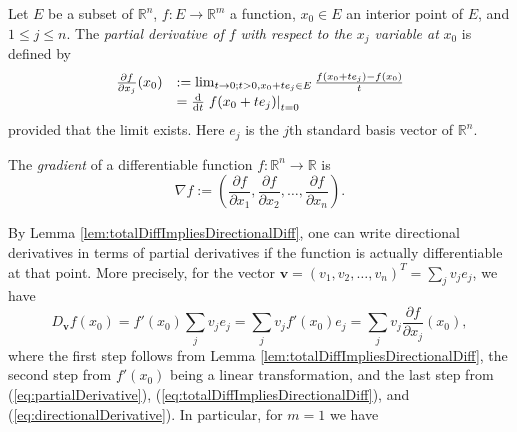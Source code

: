 \begin{defn}
  \label{def:partialDerivative}
  Let $E$ be a subset of $\mathbb{R}^n$,
  $f: E\rightarrow \mathbb{R}^m$ a function,
  $x_0\in E$ an interior point of $E$,
  and $1\le j \le n$.
  The \emph{partial derivative of $f$ with respect to the $x_j$
    variable at} $x_0$ is defined by
  \begin{equation}
    \label{eq:partialDerivative}
    \begin{array}{ll}
    \frac{\partial f}{\partial x_j}(x_0) &:=
    \lim_{t\rightarrow 0; t>0, x_0+te_j\in E} \frac{f(x_0+te_j) -
      f(x_0)}{t} \\
      &= \frac{\mathrm{d}}{\mathrm{d} t} \left. f(x_0+te_j)\right|_{t=0}
    \end{array}
  \end{equation}
  provided that the limit exists.
  Here $e_j$ is the $j$th standard basis vector of $\mathbb{R}^n$.
\end{defn}

\begin{defn}
  \label{def:gradient}
  The \emph{gradient} of a differentiable function
  $f: \mathbb{R}^n\rightarrow \mathbb{R}$ is
  \begin{equation}
    \label{eq:gradient}
    \nabla f := \left(
      \frac{\partial f}{\partial x_1}, 
      \frac{\partial f}{\partial x_2}, 
      \ldots,
      \frac{\partial f}{\partial x_n}
      \right).
  \end{equation}  
\end{defn}

\begin{rem}
  By Lemma \ref{lem:totalDiffImpliesDirectionalDiff},
  one can write directional derivatives
  in terms of partial derivatives
  if the function is actually differentiable at that point.
  More precisely, for the vector
  $\mathbf{v}=(v_1, v_2, \ldots, v_n)^T=\sum_j v_j e_j$,
  we have
  \begin{displaymath}
    D_{\mathbf{v}} f(x_0) = f'(x_0) \sum_j v_j e_j = \sum_j v_j
    f'(x_0) e_j = \sum_j v_j \frac{\partial f}{\partial x_j}(x_0), 
  \end{displaymath}
  where the first step follows from Lemma
  \ref{lem:totalDiffImpliesDirectionalDiff},
  the second step from $f'(x_0)$ being a linear transformation,
  and the last step from (\ref{eq:partialDerivative}),
  (\ref{eq:totalDiffImpliesDirectionalDiff}), and
  (\ref{eq:directionalDerivative}).
  In particular, for $m=1$ we have
\end{rem}

